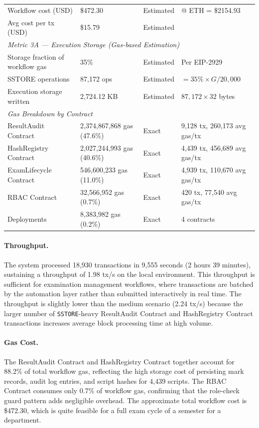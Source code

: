 \documentclass[conference]{IEEEtran}
\begin{document}
\begin{table}[!h]
\begin{tabularx}{\textwidth}{p{5cm} p{3.5cm} p{2cm} X}
Workflow cost (USD)            & \$472.30    & Estimated & @ ETH = \$2154.93 \\
Avg cost per tx (USD)         & \$15.79         & Estimated & \\
\midrule
\multicolumn{4}{l}{\textit{Metric 3A --- Execution Storage (Gas-based Estimation)}} \\
\midrule
Storage fraction of workflow gas & 35\%          & Estimated & Per EIP-2929 \\
SSTORE operations              & 87,172 ops      & Estimated & $= 35\% \times G / 20{,}000$ \\
Execution storage written      & 2,724.12 KB     & Estimated & $87{,}172 \times 32$ bytes \\
\midrule
\multicolumn{4}{l}{\textit{Gas Breakdown by Contract}} \\
\midrule
ResultAudit Contract   & 2,374,867,868 gas (47.6\%) & Exact & 9,128 tx,  260,173 avg gas/tx \\
HashRegistry Contract  & 2,027,244,993 gas (40.6\%) & Exact & 4,439 tx, 456,689 avg gas/tx \\
ExamLifecycle Contract & 546,600,233 gas (11.0\%)   & Exact & 4,939 tx, 110,670 avg gas/tx \\
RBAC Contract          & 32,566,952 gas (0.7\%)     & Exact & 420 tx, 77,540 avg gas/tx \\
Deployments                         & 8,383,982 gas (0.2\%)      & Exact & 4 contracts \\
\bottomrule
\end{tabularx}
\end{table}

\paragraph{Throughput.}
The system processed 18,930 transactions in 9,555 seconds (2 hours 39 minutes),
sustaining a throughput of 1.98 tx/s on the local environment. This
throughput is sufficient for examination management workflows, where
transactions are batched by the automation layer rather than submitted
interactively in real time. The throughput is slightly lower than the medium
scenario (2.24 tx/s) because the larger number of \texttt{SSTORE}-heavy
ResultAudit Contract and HashRegistry Contract
transactions increases average block processing time at high volume.

\paragraph{Gas Cost.}
The ResultAudit Contract and HashRegistry Contract
together account for 88.2\% of total workflow gas, reflecting the high
storage cost of persisting mark records, audit log entries, and script
hashes for 4,439 scripts. The RBAC Contract consumes only
0.7\% of workflow gas, confirming that the role-check guard pattern adds
negligible overhead. The approximate total workflow cost is \$472.30, which is quite feasible for a full exam cycle of a semester for a department. 
\end{document}

